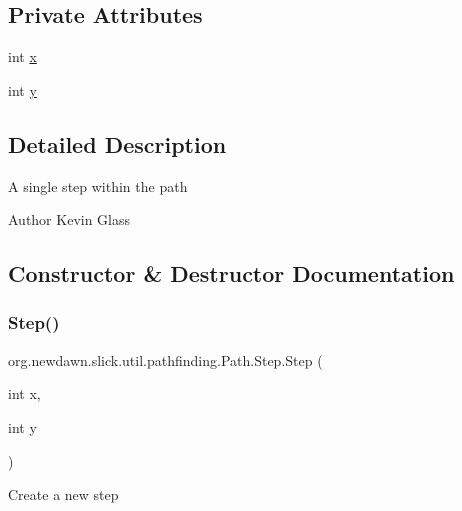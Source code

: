 \subsection*{Private Attributes}
\begin{DoxyCompactItemize}
\item 
int \mbox{\hyperlink{classorg_1_1newdawn_1_1slick_1_1util_1_1pathfinding_1_1_path_1_1_step_a6764404c2d713db22efbeb2ec33cbdc1}{x}}
\item 
int \mbox{\hyperlink{classorg_1_1newdawn_1_1slick_1_1util_1_1pathfinding_1_1_path_1_1_step_ae77364516b69d2b5ed5ed550413c05e9}{y}}
\end{DoxyCompactItemize}


\subsection{Detailed Description}
A single step within the path

\begin{DoxyAuthor}{Author}
Kevin Glass 
\end{DoxyAuthor}


\subsection{Constructor \& Destructor Documentation}
\mbox{\label{classorg_1_1newdawn_1_1slick_1_1util_1_1pathfinding_1_1_path_1_1_step_ab0228967bede7207738a1e95a9cdc183}} 
\subsubsection{\texorpdfstring{Step()}{Step()}}
{\footnotesize\ttfamily org.\+newdawn.\+slick.\+util.\+pathfinding.\+Path.\+Step.\+Step (\begin{DoxyParamCaption}\item[{int}]{x,  }\item[{int}]{y }\end{DoxyParamCaption})\hspace{0.3cm}{\ttfamily [inline]}}

Create a new step


